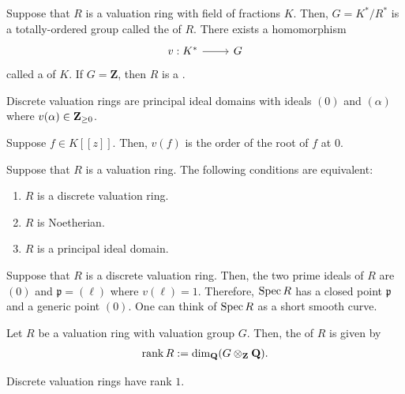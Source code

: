 \documentclass [11 pt, oneside] {article}
\begin{document}
Suppose that $R$ is a valuation ring with field of fractions $K$. Then, $G = K^*/R^*$ is a totally-ordered group called the  of $R$. There exists a homomorphism 
\[
\begin{tikzcd}
v:K^*\ar[r]& G
\end{tikzcd}
\] 
called a  of $K$. If $G=\mathbf{Z}$, then $R$ is a .

Discrete valuation rings are principal ideal domains with ideals $(0)$ and $(\alpha)$ where $v(\alpha)\in \mathbf Z_{\ge 0}$. 

Suppose $f\in K[\![z]\!]$. Then, $v(f)$ is the order of the root of $f$ at $0$.

\begin{proposition}[ ]\label{}\text{}
Suppose that $R$ is a valuation ring. The following conditions are equivalent:
\begin{enumerate}
	\item $R$ is a discrete valuation ring.
	\item $R$ is Noetherian.
	\item $R$ is a principal ideal domain.
\end{enumerate}
\end{proposition}

Suppose that $R$ is a discrete valuation ring. Then, the two prime ideals of $R$ are $(0)$ and $\mathfrak{p}= (\ell)$ where $v(\ell)=1$. Therefore, $\operatorname{Spec} R$ has a closed point $\mathfrak{p}$ and a generic point $(0)$. One can think of $\operatorname{Spec} R$ as a short smooth curve.

\begin{definition}[ ]\label{}\text{}
Let $R$ be a valuation ring with valuation group $G$. Then, the  of $R$ is given by
\begin{align*}
	\operatorname{rank} R := \dim_\mathbf{Q} (G\otimes_\mathbf{Z}\mathbf{Q}).
\end{align*}
\end{definition}

\begin{remark}
	Discrete valuation rings have rank $1$.
\end{remark}
\end{document}
